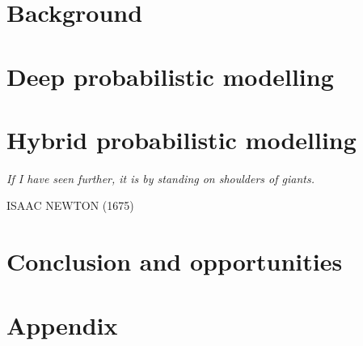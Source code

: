 \documentclass[twoside,openright,titlepage,numbers=noenddot,headinclude,%
               footinclude=true,cleardoublepage=empty,abstractoff,BCOR=5mm,%
               paper=a4,fontsize=11pt,english]{scrreprt}
\numberwithin{theorem}{chapter}
\numberwithin{definition}{chapter}
\numberwithin{algorithm}{chapter}
\numberwithin{figure}{chapter}
\numberwithin{table}{chapter}
\numberwithin{equation}{chapter}
\begin{document}
\frenchspacing
\raggedbottom
{}
\pagestyle{plain}



\cleardoublepage
\cleardoublepage
\cleardoublepage
\pagestyle{scrheadings}
\cleardoublepage





\cleardoublepage

\cleardoublepage
\part{Background}\label{part:0}
\cleardoublepage
\part{Deep probabilistic modelling}\label{part:1}
\cleardoublepage
\cleardoublepage

\part{Hybrid probabilistic modelling}\label{part:2}

\null\vfill

{\centering
\parbox{\textwidth}{%
  \raggedright{\huge\itshape%
   If I have seen further, it is by standing on shoulders of giants.\par\bigskip
  }
  \raggedleft\Large\MakeUppercase{Isaac Newton (1675)}\par%
}}

\vfill\vfill

\cleardoublepage
\cleardoublepage

\cleardoublepage
\makeatletter
\def\toclevel@chapter{-1}
\makeatother

\part{Conclusion and opportunities}\label{part:2}



\appendix
\cleardoublepage
\part{Appendix}

\cleardoublepage
\cleardoublepage
\end{document}
